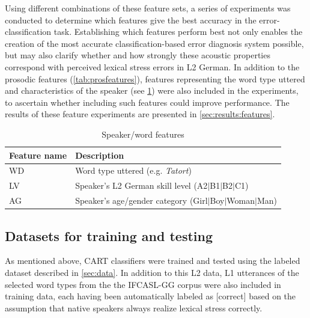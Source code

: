 \documentclass[a4paper]{article}
\begin{document}
	   
		
		 Using different combinations of these feature sets, a series of experiments was conducted to determine which features give the best accuracy in the error-classification task. Establishing which features perform best not only enables the creation of the most accurate classification-based error diagnosis system possible, but may also clarify whether and how strongly these acoustic properties correspond with perceived lexical stress errors in L2 German.
		 In addition to the prosodic features (\cref{tab:prosfeatures}), features representing the word type uttered and characteristics of the speaker (see \cref{tab:spkrfeatures}) were also included in the experiments, to ascertain whether including such features could improve performance.
		The results of these feature experiments are presented in \cref{sec:results:features}.
		
		\begin{table}
			\centering
			\caption{Speaker/word features}
			\begin{tabularx}{\columnwidth}{lX}
			\toprule
			Feature name & Description \\
			\midrule
			WD %
				& Word type uttered (e.g. \textit{Tatort}) \\
			LV %
				& Speaker's L2 German skill level \newline (A2$|$B1$|$B2$|$C1)\\
			AG %
				& Speaker's age/gender category \newline (Girl$|$Boy$|$Woman$|$Man)\\
			\bottomrule
			\end{tabularx}
			\label{tab:spkrfeatures}		
		\end{table}
	    
	    
	    \subsection{Datasets for training and testing}
	    \label{sec:method:datasets}

		As mentioned above, CART classifiers were trained and tested using the labeled dataset described in \cref{sec:data}. In addition to this L2 data, L1 utterances of the selected word types from the the IFCASL-GG corpus were also included in training data, each having been automatically labeled as [correct] based on the assumption that native speakers always realize lexical stress correctly.
\end{document}
